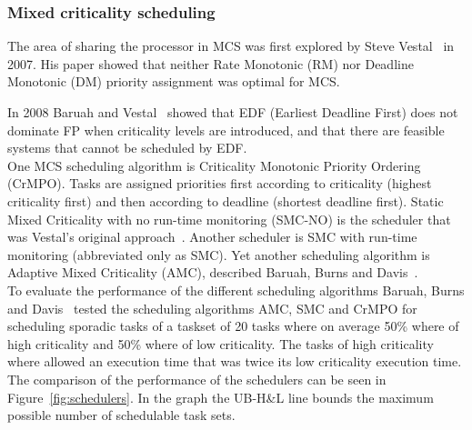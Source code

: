 \subsubsection{Mixed criticality scheduling}
The area of sharing the processor in MCS was first explored by Steve Vestal~\cite{vestal2007} in 2007. His paper showed that neither Rate Monotonic (RM) nor Deadline Monotonic (DM) priority assignment was optimal for MCS.%

In 2008 Baruah and Vestal~\cite{baruah2008} showed that EDF (Earliest Deadline First) does not dominate FP when criticality levels are introduced, and that there are feasible systems that cannot be scheduled by EDF.\\

One MCS scheduling algorithm is Criticality Monotonic Priority Ordering (CrMPO). Tasks are assigned priorities first according to criticality (highest criticality first) and then according to deadline (shortest deadline first). Static Mixed Criticality with no run-time monitoring (SMC-NO) is the scheduler that was Vestal's original approach~\cite{vestal2007}. Another scheduler is SMC with run-time monitoring (abbreviated only as SMC). Yet another scheduling algorithm is Adaptive Mixed Criticality (AMC), described Baruah, Burns and Davis~\cite{baruah2011}.\\


To evaluate the performance of the different scheduling algorithms Baruah, Burns and Davis~\cite{baruah2011} tested the scheduling algorithms AMC, SMC and CrMPO for scheduling sporadic tasks of a taskset of 20 tasks where on average 50\% where of high criticality and 50\% where of low criticality. The tasks of high criticality where allowed an execution time that was twice its low criticality execution time. The comparison of the performance of the schedulers can be seen in Figure~\ref{fig:schedulers}. In the graph the UB-H\&L line bounds the maximum possible number of schedulable task sets.

